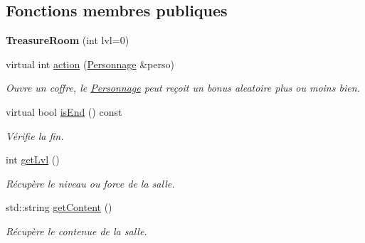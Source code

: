 \subsection*{Fonctions membres publiques}
\begin{DoxyCompactItemize}
\item 
\hypertarget{class_treasure_room_a1a670b1d1e5d0f7f40861bac17e89de2}{{\bfseries Treasure\-Room} (int lvl=0)}\label{class_treasure_room_a1a670b1d1e5d0f7f40861bac17e89de2}

\item 
virtual int \hyperlink{class_treasure_room_af2719c053785a2523dcd902820766bea}{action} (\hyperlink{class_personnage}{Personnage} \&perso)
\begin{DoxyCompactList}\small\item\em Ouvre un coffre, le \hyperlink{class_personnage}{Personnage} peut reçoit un bonus aleatoire plus ou moins bien. \end{DoxyCompactList}\item 
virtual bool \hyperlink{class_room_comportement_a240991f90b07c35e0e9114e6a203ba88}{is\-End} () const 
\begin{DoxyCompactList}\small\item\em Vérifie la fin. \end{DoxyCompactList}\item 
int \hyperlink{class_room_comportement_a645473f228c0e73532a309ad512456eb}{get\-Lvl} ()
\begin{DoxyCompactList}\small\item\em Récupère le niveau ou force de la salle. \end{DoxyCompactList}\item 
std\-::string \hyperlink{class_room_comportement_a6927d638d17858a303d77b449c7552b4}{get\-Content} ()
\begin{DoxyCompactList}\small\item\em Récupère le contenue de la salle. \end{DoxyCompactList}\end{DoxyCompactItemize}
